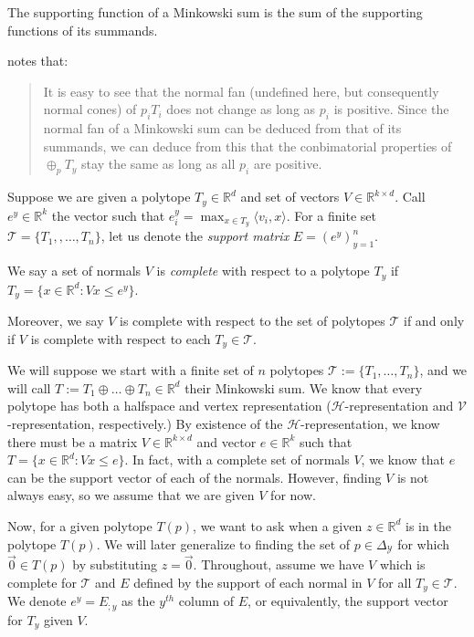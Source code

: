 \documentclass[anon]{colt2020} %
\newcommand{\reals}{\mathbb{R}}
\newcommand{\simplex}{\Delta_\Y}
\renewcommand{\H}{\mathcal{H}}
\newcommand{\T}{\mathcal{T}}
\newcommand{\V}{\mathcal{V}}
\newcommand{\Y}{\mathcal{Y}}
\newcommand{\inprod}[2]{\langle #1, #2 \rangle}%
\begin{document}
\begin{theorem}\label{thm:support-minksum}
	The supporting function of a Minkowski sum is the sum of the supporting functions of its summands.
\end{theorem}


\cite{weibel2007minkowski} notes that:
\begin{quote}
	It is easy to see that the normal fan (undefined here, but consequently normal cones) of $p_i T_i$ does not change as long as $p_i$ is positive.  Since the normal fan of a Minkowski sum can be deduced from that of its summands, we can deduce from this that the conbimatorial properties of $\oplus_p T_y$ stay the same as long as all $p_i$ are positive.
\end{quote}

Suppose we are given a polytope $T_y \in \reals^d$ and set of vectors $V \in \reals^{k \times d}$.
Call $e^y \in \reals^k$ the vector such that $e^y_i = \max_{x \in T_y}\inprod{v_i}{x}$.  
For a finite set $\T = \{T_1, , \ldots, T_n\}$, let us denote the \emph{support matrix} $E = (e^y)_{y=1}^n$.
\begin{definition}\label{def:complete}
	We say a set of normals $V$ is \emph{complete} with respect to a polytope $T_y$ if $T_y = \{x \in \reals^d: Vx \leq e^y\}$.
\end{definition}
Moreover, we say $V$ is complete with respect to the set of polytopes $\T$ if and only if $V$ is complete with respect to each $T_y \in \T$.


We will suppose we start with a finite set of $n$ polytopes $\T := \{T_1, \ldots, T_n\}$, and we will call $T := T_1 \oplus \ldots \oplus T_n \in \reals^d$ their Minkowski sum.
We know that every polytope has both a halfspace and vertex representation ($\H$-representation and $\V$-representation, respectively.)
By existence of the $\H$-representation, we know there must be a matrix $V \in \reals^{k \times d}$ and vector $e \in \reals^k$ such that $T = \{x \in \reals^d : Vx \leq e\}$.
In fact, with a complete set of normals $V$, we know that $e$ can be the support vector of each of the normals.
However, finding $V$ is not always easy, so we assume that we are given $V$ for now.

Now, for a given polytope $T(p)$, we want to ask when a given $z \in \reals^d$ is in the polytope $T(p)$.
We will later generalize to finding the set of $p \in \simplex$ for which $\vec 0 \in T(p)$ by substituting $z= \vec 0$.
Throughout, assume we have $V$ which is complete for $\T$ and $E$ defined by the support of each normal in $V$ for all $T_y \in \T$.
We denote $e^y = E_{;y}$ as the $y^{th}$ column of $E$, or equivalently, the support vector for $T_y$ given $V$.
\end{document}
